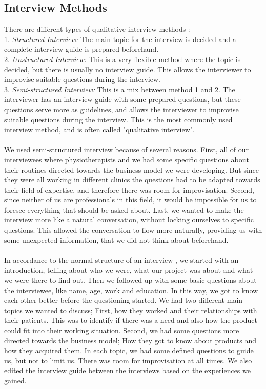 \subsection{Interview Methods}
There are different types of qualitative interview methods \cite{interview} \cite{interview2}: \\ 
1. \emph{Structured Interview:} The main topic for the interview is decided and a complete interview guide is prepared beforehand. \\ 
2. \emph{Unstructured Interview:} This is a very flexible method where the topic is decided, but there is usually no interview guide. This allows the interviewer to improvise suitable questions during the interview. \\ 
3. \emph{Semi-structured Interview:} This is a mix between method 1 and 2. The interviewer has an interview guide with some prepared questions, but these questions serve more as guidelines, and allows the interviewer to improvise suitable questions during the interview. This is the most commonly used interview method, and is often called "qualitative interview". \cite{interview} \cite{interview2} \\ \\
We used semi-structured interview because of several reasons. First, all of our interviewees where physiotherapists and we had some specific questions about their routines directed towards the business model we were developing. But since they were all working in different clinics the questions had to be adapted towards their field of expertise, and therefore there was room for improvisation. Second, since neither of us are professionals in this field, it would be impossible for us to foresee everything that should be asked about. Last, we wanted to make the interview more like a natural conversation, without locking ourselves to specific questions. This allowed the conversation to flow more naturally, providing us with some unexpected information, that we did not think about beforehand. \\ \\
In accordance to the normal structure of an interview \cite{interview2}, we started with an introduction, telling about who we were, what our project was about and what we were there to find out. Then we followed up with some basic questions about the interviewee, like name, age, work and education. In this way, we got to know each other better before the questioning started. We had two different main topics we wanted to discuss; First, how they worked and their relationships with their patients. This was to identify if there was a need and also how the product could fit into their working situation. Second, we had some questions more directed towards the business model; How they got to know about products and how they acquired them. In each topic, we had some defined questions to guide us, but not to limit us. There was room for improvisation at all times. We also edited the interview guide between the interviews based on the experiences we gained.

